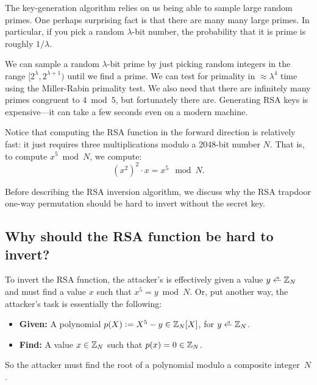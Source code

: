 \begin{remark}
The key-generation algorithm relies on us being able
to sample large random primes.
One perhaps surprising fact is that there are many many 
large primes.
In particular, if you pick a random $\lambda$-bit number,
the probability that it is prime is roughly $1/\lambda$.

We can sample a random $\lambda$-bit prime by just
picking random integers in the range $[2^\lambda, 2^{\lambda + 1})$
until we find a prime.
We can test for primality in $\approx \lambda^4$ time using
the Miller-Rabin primality test.
We also need that there are infinitely many primes congruent to
$4 \bmod 5$, but fortunately there are.
Generating RSA keys is expensive---it can take
a few seconds even on a modern machine.
\end{remark}

Notice that computing the RSA function in the forward direction is
relatively fast: it just requires three multiplications 
modulo a 2048-bit number $N$. That is, to compute $x^5 \bmod N$, we compute:
\[ (x^2)^2 \cdot x = x^5\mod N.\]


\medskip

Before describing the RSA inversion algorithm, we discuss 
why the RSA trapdoor one-way permutation should be hard
to invert without the secret key.

\subsection{Why should the RSA function be hard to invert?}
To invert the RSA function, the attacker's is effectively given
a value $y \getsr \Z_N$ and must find a value $x$ such that $x^5 = y \bmod N$.
Or, put another way, the attacker's task is essentially the following:
\begin{itemize}
  \item \textbf{Given:} A polynomial $p(X) \mathrel{\mathop:}= X^5 - y \in \mathbb{Z}_N[X]$,
                        for $y \getsr \Z_N$.
  \item \textbf{Find:}  A value $x \in \mathbb{Z}_N$ such that $p(x) = 0 \in \mathbb{Z}_N$.
\end{itemize}

So the attacker must find the root of a polynomial modulo a composite integer~$N$.


